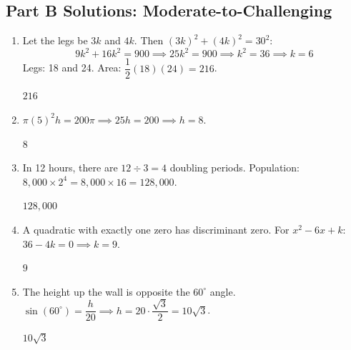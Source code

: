 \documentclass[14pt]{extarticle}
\begin{document}
\subsection*{Part B Solutions: Moderate-to-Challenging}
\begin{enumerate}
  \item Let the legs be \(3k\) and \(4k\). Then \((3k)^2 + (4k)^2 = 30^2\):
  \[
  9k^2 + 16k^2 = 900 \implies 25k^2 = 900 \implies k^2 = 36 \implies k = 6
  \]
  Legs: 18 and 24. Area: \(\dfrac{1}{2}(18)(24) = 216\).

  \(\boxed{216}\)

  \item \(\pi(5)^2 h = 200\pi \implies 25h = 200 \implies h = 8\).

  \(\boxed{8}\)

  \item In 12 hours, there are \(12 \div 3 = 4\) doubling periods. Population: \(8{,}000 \times 2^4 = 8{,}000 \times 16 = 128{,}000\).

  \(\boxed{128{,}000}\)

  \item A quadratic with exactly one zero has discriminant zero. For \(x^2 - 6x + k\): \(36 - 4k = 0 \implies k = 9\).

  \(\boxed{9}\)

  \item The height up the wall is opposite the \(60^\circ\) angle. \(\sin(60^\circ) = \dfrac{h}{20} \implies h = 20 \cdot \dfrac{\sqrt{3}}{2} = 10\sqrt{3}\).

  \(\boxed{10\sqrt{3}}\)
\end{enumerate}
\end{document}
